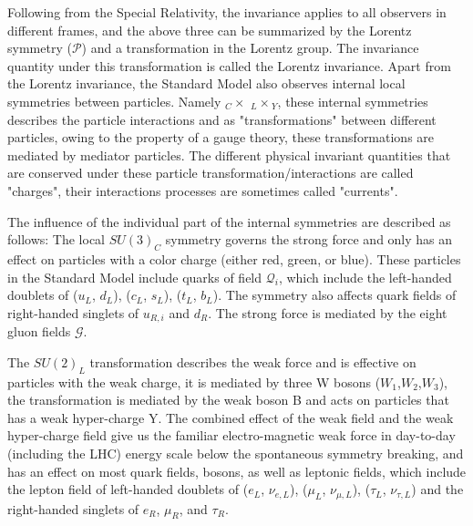 Following from the Special Relativity, the invariance applies to all observers in different frames, and the above three can be summarized by the Lorentz symmetry ($\mathcal{P}$) and a transformation in the Lorentz group. The invariance quantity under this transformation is called the Lorentz invariance. 
    Apart from the Lorentz invariance, the Standard Model also observes internal local symmetries between particles. Namely  \SUthree$_C \times $ \SUtwo$_L \times$\Uone$_{Y}$, these internal symmetries describes the particle interactions and as "transformations" between different particles, owing to the property of a gauge theory, these transformations are mediated by mediator particles. The different physical invariant quantities that are conserved under these particle
    transformation/interactions are called "charges", their interactions processes are sometimes called "currents".

    The influence of the individual part of the internal symmetries are described as follows: The local $SU(3)_{C}$ symmetry governs the strong force and only has an effect on particles with a color charge (either red, green, or blue). These particles in the Standard Model include quarks of field $\mathcal{Q}_{i}$, which include the left-handed doublets of ($u_{L}$, $d_{L}$), ($c_{L}$, $s_{L}$), ($t_{L}$, $b_{L}$). The symmetry also affects quark fields of right-handed singlets of $u_{R,i}$ and $d_{R}$. The strong force is mediated by the eight gluon fields $\mathcal{G}$.

    The $SU(2)_{L}$ transformation describes the weak force and is effective on particles with the weak charge, it is mediated by three W bosons ($W_{1}$,$W_{2}$,$W_{3}$), the \Uone transformation is mediated by the weak boson B and acts on particles that has a weak hyper-charge Y. The combined effect of the weak field and the weak hyper-charge field give us the familiar electro-magnetic weak force in day-to-day (including the LHC) energy scale below the spontaneous symmetry breaking, and has an
    effect on most quark fields, bosons, as well as leptonic fields, which include the lepton field of left-handed doublets of ($e_{L}$, $\nu_{e,L}$), ($\mu_{L}$, $\nu_{\mu,L}$), ($\tau_{L}$, $\nu_{\tau,L}$) and the right-handed singlets of $e_{R}$, $\mu_{R}$, and $\tau_{R}$.
    

